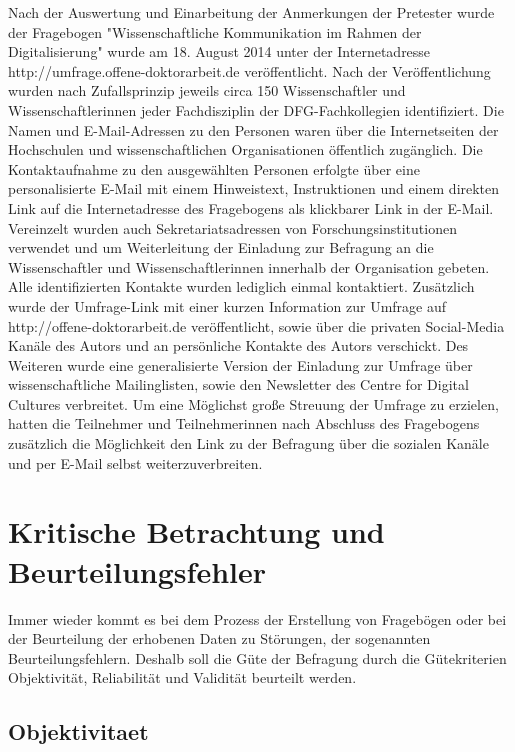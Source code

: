 Nach der Auswertung und Einarbeitung der Anmerkungen der Pretester wurde der Fragebogen "Wissenschaftliche Kommunikation im Rahmen der Digitalisierung" wurde am 18. August 2014 unter der Internetadresse http://umfrage.offene-doktorarbeit.de veröffentlicht. Nach der Veröffentlichung wurden nach Zufallsprinzip jeweils circa 150 Wissenschaftler und Wissenschaftlerinnen jeder Fachdisziplin der DFG-Fachkollegien identifiziert. Die Namen und E-Mail-Adressen zu den Personen waren über die Internetseiten der Hochschulen und wissenschaftlichen Organisationen öffentlich zugänglich. Die Kontaktaufnahme zu den ausgewählten Personen erfolgte über eine personalisierte E-Mail mit einem Hinweistext, Instruktionen und einem direkten Link auf die Internetadresse des Fragebogens als klickbarer Link in der E-Mail. Vereinzelt wurden auch Sekretariatsadressen von Forschungsinstitutionen verwendet und um Weiterleitung der Einladung zur Befragung an die Wissenschaftler und Wissenschaftlerinnen innerhalb der Organisation gebeten. Alle identifizierten Kontakte wurden lediglich einmal kontaktiert. Zusätzlich wurde der Umfrage-Link mit einer kurzen Information zur Umfrage auf http://offene-doktorarbeit.de veröffentlicht, sowie über die privaten Social-Media Kanäle des Autors und an persönliche Kontakte des Autors verschickt. Des Weiteren wurde eine generalisierte Version der Einladung zur Umfrage über wissenschaftliche Mailinglisten, sowie den Newsletter des Centre for Digital Cultures verbreitet. Um eine Möglichst große Streuung der Umfrage zu erzielen, hatten die Teilnehmer und Teilnehmerinnen nach Abschluss des Fragebogens zusätzlich die Möglichkeit den Link zu der Befragung über die sozialen Kanäle und per E-Mail selbst weiterzuverbreiten.

\section{Kritische Betrachtung und Beurteilungsfehler}

Immer wieder kommt es bei dem Prozess der Erstellung von Fragebögen oder bei der Beurteilung der erhobenen Daten zu Störungen, der sogenannten Beurteilungsfehlern. Deshalb soll die Güte der Befragung durch die Gütekriterien Objektivität, Reliabilität und Validität beurteilt werden.

\subsection[Objektivität]{Objektivitaet}

